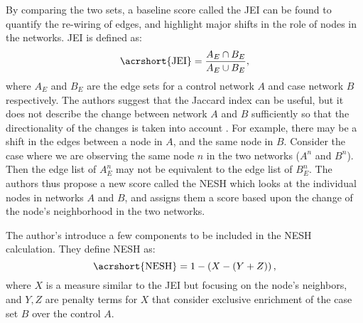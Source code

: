 By comparing the two sets, a baseline score called the \acrfull{JEI} can be found to quantify the re-wiring of edges, and highlight major shifts in the role of nodes in the networks. \acrshort{JEI} is defined as:
\begin{equation}\label{eq:JEI}
    \text{\acrshort{JEI}} = \frac{A_E \cap B_E}{A_E \cup B_E},
\end{equation}
where $A_E$ and $B_E$ are the edge sets for a control network $A$ and case network $B$ respectively. The authors suggest that the Jaccard index can be useful, but it does not describe the change between network $A$ and $B$ sufficiently so that the directionality of the changes is taken into account \citep{Kuntal2018}. For example, there may be a shift in the edges between a node in $A$, and the same node in $B$. Consider the case where we are observing the same node $n$ in the two networks ($A^n$ and $B^n$). Then the edge list of $A^n_E$ may not be equivalent to the edge list of $B^n_E$. The authors thus propose a new score called the \acrfull{NESH} which looks at the individual nodes in networks $A$ and $B$, and assigns them a score based upon the change of the node's neighborhood in the two networks.

The author's introduce a few components to be included in the \acrshort{NESH} calculation. They define \acrshort{NESH} as:
\begin{equation}\label{eq:NESH}
    \text{\acrshort{NESH}} = 1 - \left(X - \left(Y +Z\right) \right),
\end{equation}
where $X$ is a measure similar to the \acrshort{JEI} but focusing on the node's neighbors, and $Y,Z$ are penalty terms for $X$ that consider exclusive enrichment of the case set $B$ over the control $A$.

